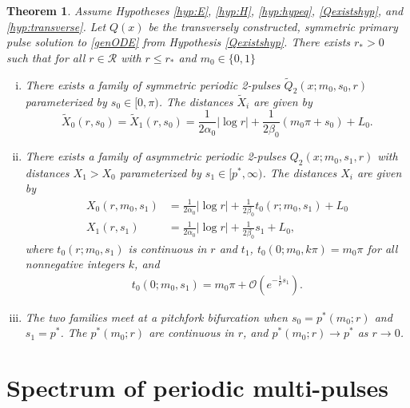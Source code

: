 \documentclass[10pt,reqno]{amsart}
\theoremstyle{plain}
\newtheorem{theorem}{Theorem}
\theoremstyle{definition}
\theoremstyle{remark}
\numberwithin{theorem}{section}
\numberwithin{equation}{section}
\begin{document}
\begin{theorem}\label{2pulsebifurcation}
Assume Hypotheses \ref{hyp:E}, \ref{hyp:H}, \ref{hyp:hypeq}, \ref{Qexistshyp}, and \ref{hyp:transverse}. Let $Q(x)$ be the transversely constructed, symmetric primary pulse solution to \eqref{genODE} from Hypothesis \ref{Qexistshyp}. There exists $r_* > 0$ such that for all $r \in \mathcal{R}$ with $r \leq r_*$ and $m_0 \in \{0, 1\}$
\begin{enumerate}[(i)]
	\item There exists a family of symmetric periodic 2-pulses $\tilde{Q}_2(x; m_0, s_0, r)$ parameterized by $s_0 \in [0, \pi)$. The distances $\tilde{X}_i$ are given by
	\begin{equation}\label{2psymmdist}
		\tilde{X}_0(r, s_0) = \tilde{X}_1(r, s_0) = \frac{1}{2 \alpha_0} |\log r| + \frac{1}{2\beta_0} (m_0 \pi + s_0) + L_0.
	\end{equation}
	\item There exists a family of asymmetric periodic 2-pulses $Q_2(x; m_0, s_1, r)$ with distances $X_1 > X_0$ parameterized by $s_1 \in [p^*, \infty)$. The distances $X_i$ are given by
	\begin{equation}\label{2pasymmdist}
	\begin{aligned}
		X_0(r, m_0, s_1) &= \frac{1}{2 \alpha_0} |\log r| + \frac{1}{2\beta_0} t_0(r; m_0, s_1) + L_0 \\
		X_1(r, s_1) &= \frac{1}{2 \alpha_0} |\log r| + \frac{1}{2\beta_0} s_1 + L_0, 
	\end{aligned}
	\end{equation}
	where $t_0(r; m_0, s_1)$ is continuous in $r$ and $t_1$, $t_0(0; m_0, k \pi) = m_0 \pi$ for all nonnegative integers $k$, and 
	\begin{align}\label{t0est}
	t_0(0; m_0, s_1) = m_0 \pi + \mathcal{O}\left(e^{-\frac{1}{\rho} s_1 }\right).
	\end{align}

	\item The two families meet at a pitchfork bifurcation when $s_0 = p^*(m_0; r)$ and $s_1 = p^*$. The $p^*(m_0; r)$ are continuous in $r$, and $p^*(m_0; r) \rightarrow p^*$ as $r \rightarrow 0$.
\end{enumerate}
\end{theorem}

\section{Spectrum of periodic multi-pulses}\label{sec:perstab}
\end{document}
